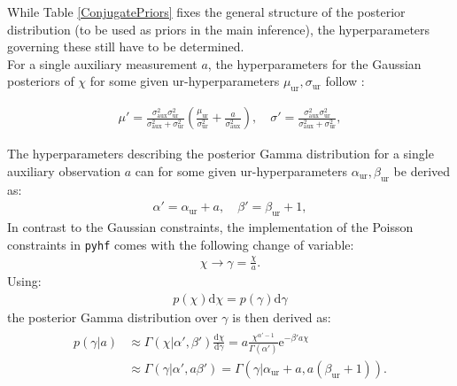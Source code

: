 \noindent While Table \ref{ConjugatePriors} fixes the general structure of the posterior distribution (to be used as priors in the main inference), the hyperparameters governing these still have to be determined. \\
For a single auxiliary measurement $a$, the hyperparameters for the Gaussian posteriors of $\chi$ for some given ur-hyperparameters $\mu_{\text{ur}}, \sigma_{\text{ur}}$ follow \cite{Murphy2007}:

    \begin{align} \label{BayesConj}
        \mu'= \frac{\sigma_{\text{aux}}^2 \sigma_{\text{ur}}^2}{\sigma_{\text{aux}}^2 + \sigma_{\text{ur}}^2} \left( \frac{\mu_{\text{ur}}}{\sigma_{\text{ur}}^2} + \frac{a}{\sigma_{\text{aux}}^2}\right) , \quad \sigma' = \frac{\sigma_{\text{aux}}^2 \sigma_{\text{ur}}^2}{\sigma_{\text{aux}}^2 + \sigma_{\text{ur}}^2},
    \end{align}

\noindent The hyperparameters describing the posterior Gamma distribution for a single auxiliary observation $a$ can for some given ur-hyperparameters $\alpha_{\text{ur}}, \beta_{\text{ur}}$ be derived as:
    \begin{align} \label{PoissonUpdating}
        \alpha' = \alpha_{\text{ur}} + a, \quad \beta' = \beta_{\text{ur}} + 1,
    \end{align}
\noindent In contrast to the Gaussian constraints, the implementation of the Poisson constraints in \texttt{pyhf} comes with the following change of variable:
    \begin{align} \label{}
        \chi  \rightarrow \gamma = \frac{\chi}{a}.
    \end{align}
\noindent Using:
    \begin{align}
        p(\chi) \mathrm{d} \chi = p(\gamma) \mathrm{d} \gamma
    \end{align}
\noindent the posterior Gamma distribution over $\gamma$ is then derived as:
    \begin{align}
    \begin{split}
        p(\gamma | a ) &\approx \Gamma(\chi | \alpha', \beta') \frac{\mathrm{d} \chi}{\mathrm{d} \gamma} = a \frac{\chi^{\alpha'-1}}{\Gamma(\alpha')} \text{e}^{-\beta' a \chi} \\
        &\approx \Gamma(\gamma | \alpha', a\beta') = \Gamma(\gamma | \alpha_{\text{ur}} + a, a(\beta_{\text{ur}} + 1)).
    \end{split}
    \end{align}


